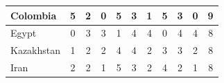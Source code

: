 \documentclass[12pt]{article}  %
\begin{document}
\begin{subappendices}
\begin{longtable}{|l|c|c|c|c|c|c|c|c|c|c|}
	\hline
	Colombia                                                       & 5                                                                      & 2                                                                      & 0                                                                      & 5                                                                      & 3                                                                      & 1                                                                      & 5                         & 3                           & 0                           & 9                           \\ 
	\hline
	Egypt                                                          & 0                                                                      & 3                                                                      & 3                                                                      & 1                                                                      & 4                                                                      & 4                                                                      & 0                         & 4                           & 4                           & 8                           \\ 
	\hline
	Kazakhstan                                                     & 1                                                                      & 2                                                                      & 2                                                                      & 4                                                                      & 4                                                                      & 2                                                                      & 3                         & 3                           & 2                           & 8                           \\ 
	\hline
	Iran                                                           & 2                                                                      & 2                                                                      & 1                                                                      & 5                                                                      & 3                                                                      & 2                                                                      & 4                         & 2                           & 1                           & 8                           \\ 

\end{longtable}
\end{subappendices}
\end{document}
